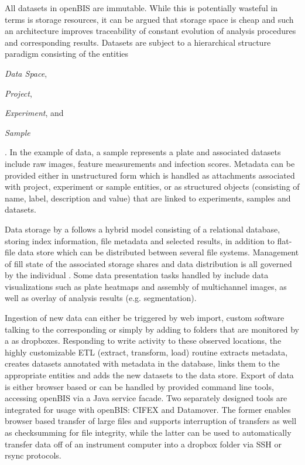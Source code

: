 All datasets in openBIS are immutable. While this is potentially wasteful in terms is storage resources, it can be argued that storage space is cheap and such an architecture improves traceability of constant evolution of analysis procedures and corresponding results. Datasets are subject to a hierarchical structure paradigm consisting of the entities \begin{enumerate*}[label=\itshape (\arabic*)] \item\textit{Data Space}, \item\textit{Project}, \item\textit{Experiment}, and \item\textit{Sample} \end{enumerate*}. In the example of   data, a sample represents a plate and associated datasets include raw images, feature measurements and infection scores. Metadata can be provided either in unstructured form which is handled as attachments associated with project, experiment or sample entities, or as structured objects (consisting of name, label, description and value) that are linked to experiments, samples and datasets.

Data storage by a  follows a hybrid model consisting of a relational database, storing index information, file metadata and selected results, in addition to flat-file data store which can be distributed between several file systems. Management of fill state of the associated storage shares and data distribution is all governed by the individual . Some data presentation tasks handled by  include data visualizations such as plate heatmaps and assembly of multichannel images, as well as overlay of analysis results (e.g. segmentation).

Ingestion of new data can either be triggered by web import, custom software talking to the corresponding  or simply by adding to folders that are monitored by a  as dropboxes. Responding to write activity to these observed locations, the highly customizable ETL (extract, transform, load) routine extracts metadata, creates datasets annotated with metadata in the  database, links them to the appropriate entities and adds the new datasets to the data store. Export of data is either browser based or can be handled by provided command line tools, accessing openBIS via a Java service facade. Two separately designed tools are integrated for usage with openBIS: CIFEX and Datamover. The former enables browser based transfer of large files and supports interruption  of transfers as well as checksumming for file integrity, while the latter can be used to automatically transfer data off of an instrument computer into a dropbox folder via SSH or rsync protocols.

